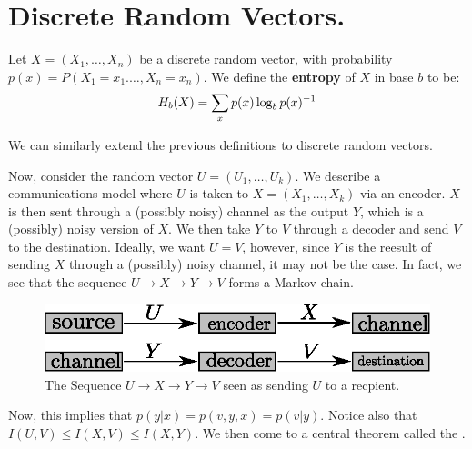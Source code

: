 
\section{Discrete Random Vectors.}
\label{section1}

\begin{definition}
    Let $X=(X_1, \dots, X_n)$ be a discrete random vector, with probability
    $p(x)=P(X_1=x_1. \dots, X_n=x_n)$. We define the \textbf{entropy} of $X$ in base
     $b$ to be:
     \begin{equation}
         H_b(X) = \sum_x{p(x)\log_b{p(x)^{-1}}}
     \end{equation}
\end{definition}
\begin{remark}
    We can similarly extend the previous definitions to discrete random
    vectors.
\end{remark}

Now, consider the random vector $U=(U_1, \dots, U_k)$. We describe a
communications model where $U$ is taken to  $X=(X_1, \dots, X_k)$ via an
encoder. $X$ is then sent through a (possibly noisy) channel as the output $Y$,
which is a (possibly) noisy version of $X$. We then take  $Y$ to  $V$ through a
decoder and send  $V$ to the destination. Ideally, we want  $U=V$, however,
since $Y$ is the reesult of sending $X$ through a (possibly) noisy channel, it
may not be the case. In fact, we see that the sequence $U \rightarrow X
\rightarrow Y \rightarrow V$ forms a Markov chain.

\begin{figure}[h]
    \centering
    \includegraphics[scale=0.5]{Figures/Chapter2/channel.eps}
    \caption{The Sequence $U \rightarrow X \rightarrow Y \rightarrow V$ seen as
    sending $U$ to a recpient.}
    \label{fig_2.7}
\end{figure}

Now, this implies that $p(y|x)=p(v,y,x)=p(v|y)$. Notice also that $I(U,V) \leq
I(X,V) \leq I(X,Y)$. We then come to a central theorem called the .

